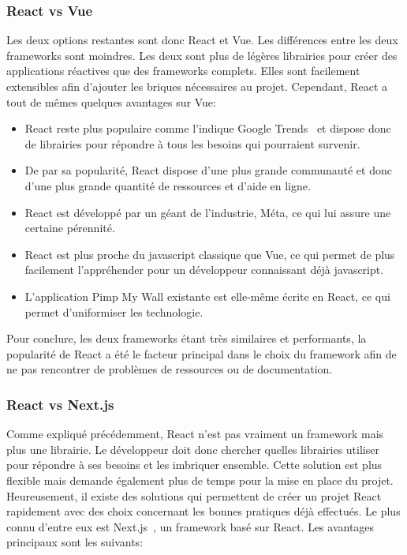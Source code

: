 \subsubsection{React vs Vue}

Les deux options restantes sont donc React et Vue. Les différences entre les deux frameworks sont moindres. Les deux sont plus de légères librairies pour créer des applications réactives que des frameworks complets. Elles sont facilement extensibles afin d'ajouter les briques nécessaires au projet. Cependant, React a tout de mêmes quelques avantages sur Vue:

\begin{itemize}
  \item React reste plus populaire comme l'indique Google Trends~\cite{google-trends-js-frameworks} et dispose donc de librairies pour répondre à tous les besoins qui pourraient survenir.
  \item De par sa popularité, React dispose d'une plus grande communauté et donc d'une plus grande quantité de ressources et d'aide en ligne.
  \item React est développé par un géant de l'industrie, Méta, ce qui lui assure une certaine pérennité.
  \item React est plus proche du \gls{javascript} classique que Vue, ce qui permet de plus facilement l'appréhender pour un développeur connaissant déjà \gls{javascript}.
  \item L'application Pimp My Wall existante est elle-même écrite en React, ce qui permet d'uniformiser les technologie.
\end{itemize}

Pour conclure, les deux frameworks étant très similaires et performants, la popularité de React a été le facteur principal dans le choix du framework afin de ne pas rencontrer de problèmes de ressources ou de documentation.

\subsubsection{React vs Next.js}

Comme expliqué précédemment, React n'est pas vraiment un framework mais plus une librairie. Le développeur doit donc chercher quelles librairies utiliser pour répondre à ses besoins et les imbriquer ensemble. Cette solution est plus flexible mais demande également plus de temps pour la mise en place du projet. Heureusement, il existe des solutions qui permettent de créer un projet React rapidement avec des choix concernant les bonnes pratiques déjà effectués. Le plus connu d'entre eux est Next.js~\cite{nextjs}, un framework basé sur React. Les avantages principaux sont les suivants:

